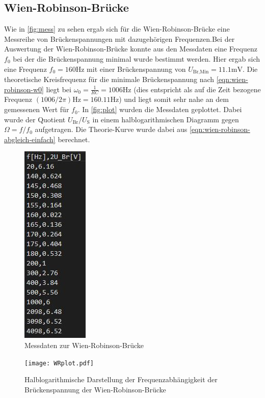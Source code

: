 \subsection{Wien-Robinson-Brücke}
Wie in \autoref{fig:mess} zu sehen ergab sich für die Wien-Robinson-Brücke eine Messreihe von Brückenspannungen mit dazugehörigen Frequenzen.Bei der Auswertung der Wien-Robinson-Brücke konnte aus den Messdaten eine Frequenz $f_0$ bei der die Brückenspannung minimal wurde bestimmt werden. Hier ergab sich eine Frequenz $f_0=160 \si{\hertz}$ mit einer Brückenspannung von $U_\text{Br,Min}=11.1 \si{\milli} \si{\volt}$. Die theoretische Kreisfrequenz für die minimale Brückenspannung nach \autoref{eqn:wien-robinson-w0} liegt bei $\omega_0=\frac{1}{RC}=1006\si{\hertz}$ (dies entspricht als auf die Zeit bezogene Frequenz $(1006/2\pi)\si{\hertz}=160.11\si{\hertz}$) und liegt somit sehr nahe an dem gemessenen Wert für $f_0$. In \autoref{fig:plot} wurden die Messdaten geplottet. Dabei wurde der Quotient $U_\text{Br}/U_{\text{S}}$ in einem halblogarithmischen Diagramm gegen $\Omega=f/f_0$ aufgetragen. Die Theorie-Kurve wurde dabei aus \autoref{eqn:wien-robinson-abgleich-einfach} berechnet.
\begin{figure}
  \centering
  \includegraphics{daten/WienR.JPG}
  \caption{Messdaten zur Wien-Robinson-Brücke}
  \label{fig:mess}
\end{figure}


\begin{figure}
  \centering
  \texttt{[image: WRplot.pdf]}
  \caption{Halblogarithmische Darstellung der Frequenzabhängigkeit der Brückenspannung der Wien-Robinson-Brücke}
  \label{fig:plot}
\end{figure}
\newpage

